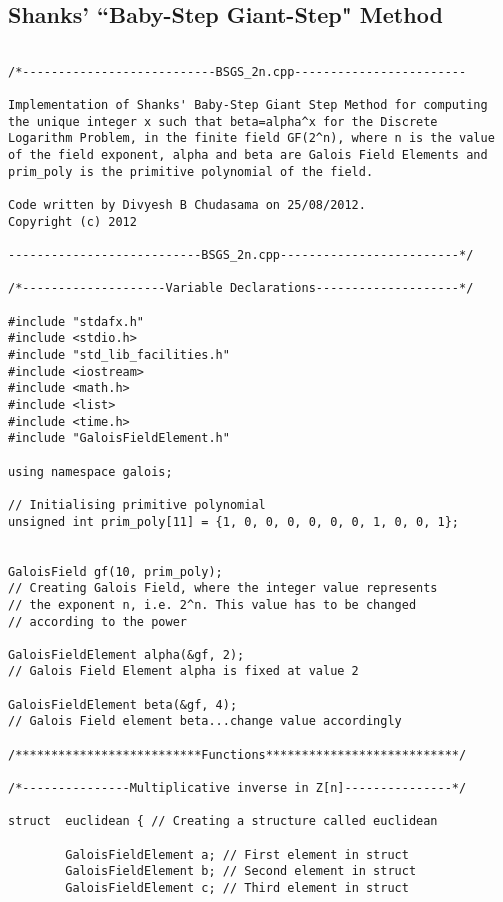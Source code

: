 \documentclass[iwp,first]{luthesis}
\begin{document}
\newpage

\subsection{Shanks' ``Baby-Step Giant-Step" Method}

\begin{verbatim}

/*---------------------------BSGS_2n.cpp------------------------

Implementation of Shanks' Baby-Step Giant Step Method for computing 
the unique integer x such that beta=alpha^x for the Discrete 
Logarithm Problem, in the finite field GF(2^n), where n is the value 
of the field exponent, alpha and beta are Galois Field Elements and 
prim_poly is the primitive polynomial of the field.

Code written by Divyesh B Chudasama on 25/08/2012.
Copyright (c) 2012

---------------------------BSGS_2n.cpp-------------------------*/

/*--------------------Variable Declarations--------------------*/

#include "stdafx.h"
#include <stdio.h>
#include "std_lib_facilities.h"
#include <iostream>
#include <math.h>
#include <list>
#include <time.h>
#include "GaloisFieldElement.h"

using namespace galois;

// Initialising primitive polynomial
unsigned int prim_poly[11] = {1, 0, 0, 0, 0, 0, 0, 1, 0, 0, 1}; 


GaloisField gf(10, prim_poly); 
// Creating Galois Field, where the integer value represents 
// the exponent n, i.e. 2^n. This value has to be changed 
// according to the power

GaloisFieldElement alpha(&gf, 2); 
// Galois Field Element alpha is fixed at value 2

GaloisFieldElement beta(&gf, 4); 
// Galois Field element beta...change value accordingly

/**************************Functions***************************/

/*---------------Multiplicative inverse in Z[n]---------------*/

struct  euclidean { // Creating a structure called euclidean
        
        GaloisFieldElement a; // First element in struct 
        GaloisFieldElement b; // Second element in struct
        GaloisFieldElement c; // Third element in struct
        

\end{verbatim}
\end{document}
